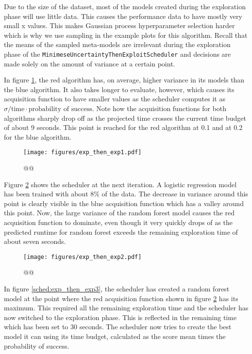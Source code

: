 \documentclass[a4paper,12pt,twoside,openright]{report}
\begin{document}
Due to the size of the dataset, most of the models created during the exploration phase will use little data. This causes the performance data to have mostly very small x values. This makes Gaussian process hyperparameter selection harder which is why we use sampling in the example plots for this algorithm. Recall that the means of the sampled meta-models are irrelevant during the exploration phase of the \texttt{MinimeseUncertaintyThenExploitScheduler} and decisions are made solely on the amount of variance at a certain point.

In figure \ref{sched:exp_then_exp1}, the red algorithm has, on average, higher variance in its models than the blue algorithm. It also takes longer to evaluate, however, which causes its acquisition function to have smaller values as the scheduler computes it as $\sigma/\text{time} \cdot \text{probability of success}$. Note how the acquisition functions for both algorithms sharply drop off as the projected time crosses the current time budget of about 9 seconds. This point is reached for the red algorithm at 0.1 and at 0.2 for the blue algorithm.


\begin{figure}
\centering
  \texttt{[image: figures/exp\_then\_exp1.pdf]}
  \caption{@@}
  \label{sched:exp_then_exp1}
\end{figure}

Figure \ref{sched:exp_then_exp2} shows the scheduler at the next iteration. A logistic regression model has been trained with about 8\% of the data. The decrease in variance around this point is clearly visible in the blue acquisition function which has a valley around this point. Now, the large variance of the random forest model causes the red acquisition function to dominate, even though it very quickly drops of as the predicted runtime for random forest exceeds the remaining exploration time of about seven seconds.

\begin{figure}
\centering
  \texttt{[image: figures/exp\_then\_exp2.pdf]}
  \caption{@@}
  \label{sched:exp_then_exp2}
\end{figure}

In figure \ref{sched:exp_then_exp3}, the scheduler has created a random forest model at the point where the red acquisition function shown in figure \ref{sched:exp_then_exp2} has its maximum. This required all the remaining exploration time and the scheduler has now switched to the exploration phase. This is reflected in the remaining time which has been set to 30 seconds. The scheduler now tries to create the best model it can using its time budget, calculated as the score mean times the probability of success.
\end{document}
